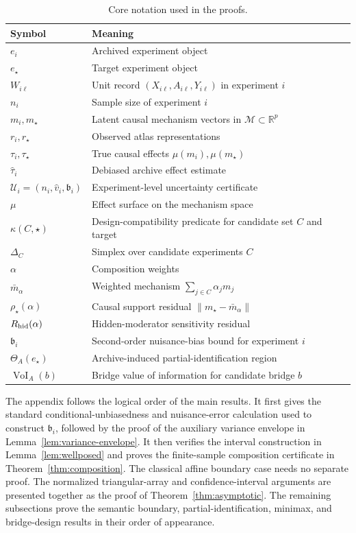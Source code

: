 \documentclass[11pt]{article}
\numberwithin{equation}{section}
\newcommand{\R}{\mathbb R}
\newcommand{\1}{\mathbf 1}
\newcommand{\cM}{\mathcal M}
\newcommand{\cU}{\mathcal U}
\newcommand{\norm}[1]{\left\lVert #1\right\rVert}
\begin{document}
\begin{table}[H]
\centering
\small
\caption{Core notation used in the proofs.}
\begin{tabular}{ll}
\toprule
Symbol & Meaning \\
\midrule
\(e_i\) & Archived experiment object \\
\(e_\star\) & Target experiment object \\
\(W_{i\ell}\) & Unit record \((X_{i\ell},A_{i\ell},Y_{i\ell})\) in experiment \(i\) \\
\(n_i\) & Sample size of experiment \(i\) \\
\(m_i,m_\star\) & Latent causal mechanism vectors in \(\cM\subset\R^p\) \\
\(r_i,r_\star\) & Observed atlas representations \\
\(\tau_i,\tau_\star\) & True causal effects \(\mu(m_i),\mu(m_\star)\) \\
\(\widehat\tau_i\) & Debiased archive effect estimate \\
\(\cU_i=(n_i,\widehat v_i,\mathfrak b_i)\) & Experiment-level uncertainty certificate \\
\(\mu\) & Effect surface on the mechanism space \\
\(\kappa(C,\star)\) & Design-compatibility predicate for candidate set \(C\) and target \\
\(\Delta_C\) & Simplex over candidate experiments \(C\) \\
\(\alpha\) & Composition weights \\
\(\bar m_\alpha\) & Weighted mechanism \(\sum_{j\in C}\alpha_jm_j\) \\
\(\rho_\star(\alpha)\) & Causal support residual \(\norm{m_\star-\bar m_\alpha}\) \\
\(R_{\rm hid}(\alpha)\) & Hidden-moderator sensitivity residual \\
\(\mathfrak b_i\) & Second-order nuisance-bias bound for experiment \(i\) \\
\(\Theta_A(e_\star)\) & Archive-induced partial-identification region \\
\(\operatorname{VoI}_A(b)\) & Bridge value of information for candidate bridge \(b\) \\
\bottomrule
\end{tabular}
\end{table}



The appendix follows the logical order of the main results.  It first gives
the standard conditional-unbiasedness and nuisance-error calculation used to
construct \(\mathfrak b_i\), followed by the proof of the auxiliary variance
envelope in Lemma~\ref{lem:variance-envelope}.  It then verifies the interval
construction in Lemma~\ref{lem:wellposed} and proves the finite-sample
composition certificate in Theorem~\ref{thm:composition}.  The classical
affine boundary case needs no separate proof.  The normalized triangular-array
and confidence-interval arguments are presented together as the proof of
Theorem~\ref{thm:asymptotic}.  The remaining subsections prove the semantic
boundary, partial-identification, minimax, and bridge-design results in their
order of appearance.
\end{document}
